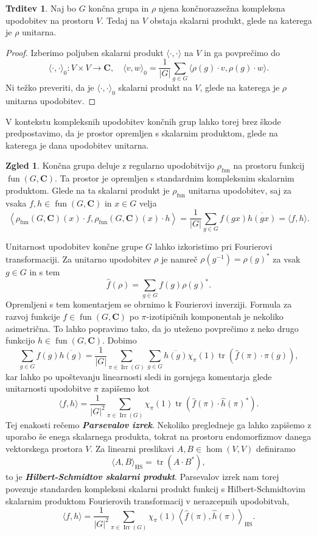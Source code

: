 \documentclass[11pt]{book}
\def\CC{\mathbf{C}}
\DeclareMathOperator\tr{tr}
\DeclareMathOperator\Irr{Irr}
\DeclareMathOperator\fun{fun}
\DeclareMathOperator\HS{HS}
\def\definicija{\color{rdeca}\bf\em}
\theoremstyle{definition}
\theoremstyle{zgled}
\newtheorem*{zgled}{Zgled}
\theoremstyle{odprtproblem}
\theoremstyle{domacanaloga}
\newenvironment{dokaz}
    {\color{siva}\begin{proof}}
    {\end{proof}}
\theoremstyle{izrek}
\newtheorem*{trditev}{Trditev}
\begin{document}
\begin{trditev}
Naj bo $G$ končna grupa in $\rho$ njena končnorazsežna kompleksna upodobitev na prostoru $V$. Tedaj na $V$ obstaja skalarni produkt, glede na katerega je $\rho$ unitarna.
\end{trditev}
\begin{dokaz}
Izberimo poljuben skalarni produkt $\langle \cdot, \cdot \rangle$ na $V$ in ga povprečimo do
\[
    \langle \cdot, \cdot \rangle_0 \colon V \times V \to \CC, \quad
    \langle v, w \rangle_0 = \frac{1}{|G|} \sum_{g \in G} \langle \rho(g) \cdot v, \rho(g) \cdot w \rangle.
\]
Ni težko preveriti, da je $\langle \cdot, \cdot \rangle_0$ skalarni produkt na $V$, glede na katerega je $\rho$ unitarna upodobitev.
\end{dokaz}

V kontekstu kompleksnih upodobitev končnih grup lahko torej brez škode predpostavimo, da je prostor opremljen s skalarnim produktom, glede na katerega je dana upodobitev unitarna.

\begin{zgled}
Končna grupa deluje z regularno upodobitvijo $\rho_{\fun}$ na prostoru funkcij $\fun(G, \CC)$. Ta prostor je opremljen s standardnim kompleksnim skalarnim produktom. Glede na ta skalarni produkt je $\rho_{\fun}$ unitarna upodobitev, saj za vsaka $f,h \in \fun(G,\CC)$ in $x \in G$ velja
\[
    \left\langle \rho_{\fun}(G,\CC)(x) \cdot f, \rho_{\fun}(G,\CC)(x) \cdot h  \right\rangle =
    \frac{1}{|G|} \sum_{g \in G} f(gx) \overline{h(gx)}
    = \langle f, h \rangle.
\]
\end{zgled}

Unitarnost upodobitev končne grupe $G$ lahko izkoristimo pri Fourierovi transformaciji. Za unitarno upodobitev $\rho$ je namreč $\rho(g^{-1}) = \rho(g)^*$ za vsak $g \in G$ in s tem
\[
    \hat{f}(\rho) = \sum_{g \in G} f(g) \rho(g)^*.
\]
Opremljeni s tem komentarjem se obrnimo k Fourierovi inverziji. Formula za razvoj funkcije $f \in \fun(G,\CC)$ po $\pi$-izotipičnih komponentah je nekoliko asimetrična. To lahko popravimo tako, da jo uteženo povprečimo z neko drugo funkcijo $h \in \fun(G,\CC)$. Dobimo
\[
    \sum_{g \in G} f(g) \overline{h(g)} = \frac{1}{|G|} \sum_{\pi \in \Irr(G)} \sum_{g \in G} \overline{h(g)} \chi_{\pi}(1) \tr \left( \hat{f}(\pi) \cdot \pi(g) \right),
\]
kar lahko po upoštevanju linearnosti sledi in gornjega komentarja glede unitarnosti upodobitve $\pi$ zapišemo kot
\[
    \langle f, h \rangle = \frac{1}{|G|^2} \sum_{\pi \in \Irr(G)} \chi_{\pi}(1) \tr(\hat{f}(\pi) \cdot \hat{h}(\pi)^*).
\]
Tej enakosti rečemo {\definicija Parsevalov izrek}. Nekoliko pregledneje ga lahko zapišemo z uporabo še enega skalarnega produkta, tokrat na prostoru endomorfizmov danega vektorskega prostora $V$. Za linearni preslikavi $A,B \in \hom(V,V)$ definiramo
\[
    \langle A, B \rangle_{\HS} = \tr(A \cdot B^*),
\]
to je {\definicija Hilbert-Schmidtov skalarni produkt}. Parsevalov izrek nam torej povezuje standarden kompleksni skalarni produkt funkcij s Hilbert-Schmidtovim skalarnim produktom Fourierovih transformacij v nerazcepnih upodobitvah,
\[
    \langle f, h \rangle = \frac{1}{|G|^2} \sum_{\pi \in \Irr(G)} \chi_{\pi}(1) \left\langle \hat{f}(\pi), \hat{h}(\pi) \right\rangle_{\HS}.
\]
\end{document}
